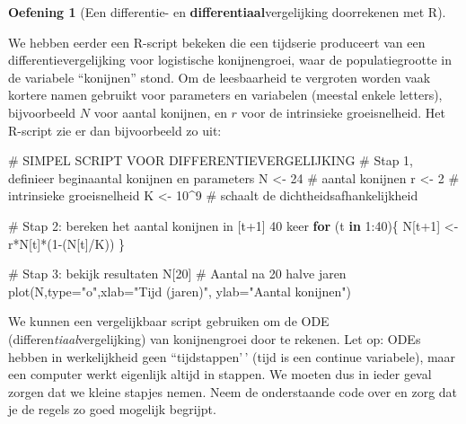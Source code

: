 \documentclass[
  a4paper,
]{scrbook}
\newenvironment{Shaded}{\begin{snugshade}}{\end{snugshade}}
\newcommand{\AttributeTok}[1]{\textcolor[rgb]{0.40,0.45,0.13}{#1}}
\newcommand{\CommentTok}[1]{\textcolor[rgb]{0.37,0.37,0.37}{#1}}
\newcommand{\ControlFlowTok}[1]{\textcolor[rgb]{0.00,0.23,0.31}{\textbf{#1}}}
\newcommand{\DecValTok}[1]{\textcolor[rgb]{0.68,0.00,0.00}{#1}}
\newcommand{\FunctionTok}[1]{\textcolor[rgb]{0.28,0.35,0.67}{#1}}
\newcommand{\NormalTok}[1]{\textcolor[rgb]{0.00,0.23,0.31}{#1}}
\newcommand{\OtherTok}[1]{\textcolor[rgb]{0.00,0.23,0.31}{#1}}
\newcommand{\SpecialCharTok}[1]{\textcolor[rgb]{0.37,0.37,0.37}{#1}}
\newcommand{\StringTok}[1]{\textcolor[rgb]{0.13,0.47,0.30}{#1}}
\theoremstyle{definition}
\newtheorem{exercise}{Oefening}[chapter]
\theoremstyle{remark}
\begin{document}
\begin{exercise}[Een differentie- en \textbf{differentiaal}vergelijking
doorrekenen met
R]\protect\hypertarget{exr-diffvsdiffinR}{}\label{exr-diffvsdiffinR}

We hebben eerder een R-script bekeken die een tijdserie produceert van
een differentievergelijking voor logistische konijnengroei, waar de
populatiegrootte in de variabele ``konijnen'' stond. Om de leesbaarheid
te vergroten worden vaak kortere namen gebruikt voor parameters en
variabelen (meestal enkele letters), bijvoorbeeld \(N\) voor aantal
konijnen, en \(r\) voor de intrinsieke groeisnelheid. Het R-script zie
er dan bijvoorbeeld zo uit:

\begin{Shaded}
\begin{Highlighting}[]
\CommentTok{\# SIMPEL SCRIPT VOOR DIFFERENTIEVERGELIJKING}
\CommentTok{\# Stap 1, definieer beginaantal konijnen en parameters}
\NormalTok{N }\OtherTok{\textless{}{-}} \DecValTok{24}    \CommentTok{\# aantal konijnen}
\NormalTok{r }\OtherTok{\textless{}{-}} \DecValTok{2}     \CommentTok{\# intrinsieke groeisnelheid}
\NormalTok{K }\OtherTok{\textless{}{-}} \DecValTok{10}\SpecialCharTok{\^{}}\DecValTok{9}  \CommentTok{\# schaalt de dichtheidsafhankelijkheid}

\CommentTok{\# Stap 2: bereken het aantal konijnen in [t+1] 40 keer}
\ControlFlowTok{for}\NormalTok{ (t }\ControlFlowTok{in} \DecValTok{1}\SpecialCharTok{:}\DecValTok{40}\NormalTok{)\{}
\NormalTok{  N[t}\SpecialCharTok{+}\DecValTok{1}\NormalTok{] }\OtherTok{\textless{}{-}}\NormalTok{ r}\SpecialCharTok{*}\NormalTok{N[t]}\SpecialCharTok{*}\NormalTok{(}\DecValTok{1}\SpecialCharTok{{-}}\NormalTok{(N[t]}\SpecialCharTok{/}\NormalTok{K))}
\NormalTok{\}}

\CommentTok{\# Stap 3: bekijk resultaten}
\NormalTok{N[}\DecValTok{20}\NormalTok{] }\CommentTok{\# Aantal na 20 halve jaren}
\FunctionTok{plot}\NormalTok{(N,}\AttributeTok{type=}\StringTok{"o"}\NormalTok{,}\AttributeTok{xlab=}\StringTok{"Tijd (jaren)"}\NormalTok{, }\AttributeTok{ylab=}\StringTok{"Aantal konijnen"}\NormalTok{)}
\end{Highlighting}
\end{Shaded}

We kunnen een vergelijkbaar script gebruiken om de ODE
(differen\emph{tiaal}vergelijking) van konijnengroei door te rekenen.
Let op: ODEs hebben in werkelijkheid geen ``tijdstappen'\,' (tijd is een
continue variabele), maar een computer werkt eigenlijk altijd in
stappen. We moeten dus in ieder geval zorgen dat we kleine stapjes
nemen. Neem de onderstaande code over en zorg dat je de regels zo goed
mogelijk begrijpt.


\end{exercise}
\end{document}
